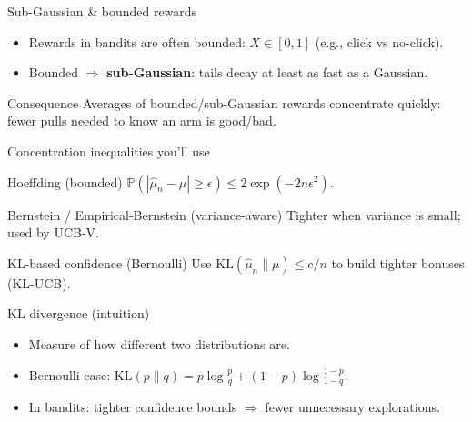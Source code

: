\documentclass[aspectratio=169]{beamer}
\newcommand{\PP}{\mathbb{P}}
\newcommand{\KL}{\mathrm{KL}}
\begin{document}
\begin{frame}{Sub-Gaussian \& bounded rewards}
\small
\begin{itemize}
  \item Rewards in bandits are often bounded: $X\in[0,1]$ (e.g., click vs no-click).
  \item Bounded $\Rightarrow$ \textbf{sub-Gaussian}: tails decay at least as fast as a Gaussian.
\end{itemize}
\begin{block}{Consequence}
Averages of bounded/sub-Gaussian rewards concentrate quickly: fewer pulls needed to know an arm is good/bad.
\end{block}
\end{frame}

\begin{frame}{Concentration inequalities you’ll use}
\small
\begin{block}{Hoeffding (bounded)}
$\PP(|\hat{\mu}_n-\mu|\ge \epsilon)\le 2\exp(-2n\epsilon^2)$.
\end{block}
\begin{block}{Bernstein / Empirical-Bernstein (variance-aware)}
Tighter when variance is small; used by UCB-V.
\end{block}
\begin{block}{KL-based confidence (Bernoulli)}
Use $\KL(\hat{\mu}_n\|\mu)\le c/n$ to build tighter bonuses (KL-UCB).
\end{block}
\end{frame}

\begin{frame}{KL divergence (intuition)}
\small
\begin{itemize}
  \item Measure of how different two distributions are.
  \item Bernoulli case: $\KL(p\|q)=p\log\frac{p}{q}+(1-p)\log\frac{1-p}{1-q}$.
  \item In bandits: tighter confidence bounds $\Rightarrow$ fewer unnecessary explorations.
\end{itemize}
\end{frame}

\end{document}
